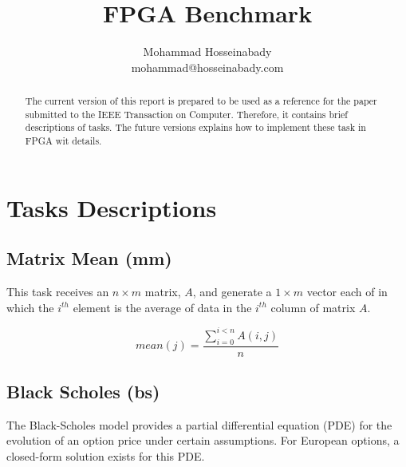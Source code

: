 \documentclass[]{report}
\title{FPGA Benchmark}
\author{Mohammad Hosseinabady \\
	mohammad@hosseinabady.com}
\begin{document}
\maketitle
\lstset{language=C}          %



\begin{abstract}
	The current version of this report is prepared to be used as a reference for the paper submitted to the IEEE Transaction on Computer. Therefore, it contains brief descriptions of tasks. The future versions explains how to implement these task in FPGA wit  details.
\end{abstract}

\chapter{Tasks Descriptions}

\section{Matrix Mean (mm)}

This task receives an $n\times m$ matrix, $A$, and generate a $1\times m$ vector each of in which  the $i^{th}$ element is the average of data in the $i^{th}$ column of matrix $A$.


\begin{equation}
 mean(j)=\frac{\sum_{i=0}^{i<n} {A(i, j)}}{n}
\end{equation}

\begin{comment}
\begin{lstlisting}[frame=single]  
for (j = 0; j < m; j++) {
  mean[j] = 0;
  for (i = 0; i < m; i++) {
    mean[j] += A[i][j];
  }
  mean[j] /= n;
}
\end{lstlisting} 
\end{comment}


\section{Black Scholes (bs)\cite{nvidia-blackscholes}}

The Black-Scholes model provides a partial differential equation (PDE) for the evolution of an option price under certain assumptions. For European options, a closed-form solution exists for this PDE. 
\end{document}
